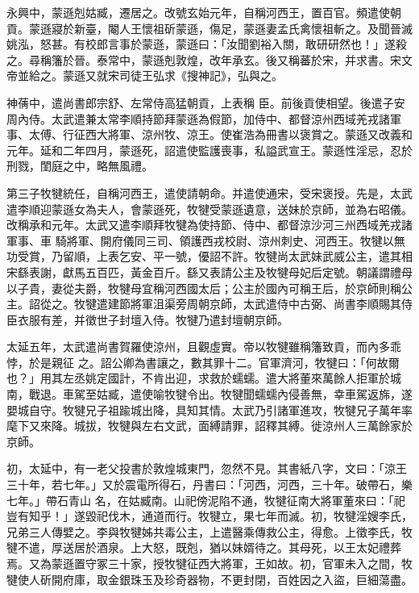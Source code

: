 \begin{pinyinscope}
 永興中，蒙遜剋姑臧，遷居之。改號玄始元年，自稱河西王，置百官。頻遣使朝貢。蒙遜寢於新臺，閹人王懷祖斫蒙遜，傷足，蒙遜妻孟氏禽懷祖斬之。及聞晉滅姚泓，怒甚。有校郎言事於蒙遜，蒙遜曰：「汝聞劉裕入關，敢研研然也！」遂殺之。尋稱籓於晉。泰常中，蒙遜剋敦煌，改年承玄。後又稱蕃於宋，并求書。宋文帝並給之。蒙遜又就宋司徒王弘求《搜神記》，弘與之。



 神蒨中，遣尚書郎宗舒、左常侍高猛朝貢，上表稱
 臣。前後貢使相望。後遣子安周內侍。太武遣兼太常李順持節拜蒙遜為假節，加侍中、都督涼州西域羌戎諸軍事、太傅、行征西大將軍、涼州牧、涼王。使崔浩為冊書以褒賞之。蒙遜又改義和元年。延和二年四月，蒙遜死，詔遣使監護喪事，私謚武宣王。蒙遜性淫忌，忍於刑戮，閨庭之中，略無風禮。



 第三子牧犍統任，自稱河西王，遣使請朝命。并遣使通宋，受宋褒授。先是，太武遣李順迎蒙遜女為夫人，會蒙遜死，牧犍受蒙遜遺意，送妹於京師，並為右昭儀。改稱承和元年。太武又遣李順拜牧犍為使持節、侍中、都督涼沙河三州西域羌戎諸軍事、車
 騎將軍、開府儀同三司、領護西戎校尉、涼州刺史、河西王。牧犍以無功受賞，乃留順，上表乞安、平一號，優詔不許。牧犍尚太武妹武威公主，遣其相宋繇表謝，獻馬五百匹，黃金百斤。繇又表請公主及牧犍母妃后定號。朝議謂禮母以子貴，妻從夫爵，牧犍母宜稱河西國太后；公主於國內可稱王后，於京師則稱公主。詔從之。牧犍遣建節將軍沮渠旁周朝京師，太武遣侍中古弼、尚書李順賜其侍臣衣服有差，并徵世子封壇入侍。牧犍乃遣封壇朝京師。



 太延五年，太武遣尚書賀羅使涼州，且觀虛實。帝以牧犍雖稱籓致貢，而內多乖悖，於是親征
 之。詔公卿為書讓之，數其罪十二。官軍濟河，牧犍曰：「何故爾也？」用其左丞姚定國計，不肯出迎，求救於蠕蠕。遣大將董來萬餘人拒軍於城南，戰退。車駕至姑臧，遣使喻牧犍令出。牧犍聞蠕蠕內侵善無，幸車駕返旆，遂嬰城自守。牧犍兄子祖踰城出降，具知其情。太武乃引諸軍進攻，牧犍兄子萬年率麾下又來降。城拔，牧犍與左右文武，面縛請罪，詔釋其縛。徙涼州人三萬餘家於京師。



 初，太延中，有一老父投書於敦煌城東門，忽然不見。其書紙八字，文曰：「涼王三十年，若七年。」又於震電所得石，丹書曰：「河西，河西，三十年。破帶石，樂七年。」帶石青山
 名，在姑臧南。山祀傍泥陷不通，牧犍征南大將軍董來曰：「祀豈有知乎！」遂毀祀伐木，通道而行。牧犍立，果七年而滅。初，牧犍淫嫂李氏，兄弟三人傳嬖之。李與牧犍姊共毒公主，上遣醫乘傳救公主，得愈。上徵李氏，牧犍不遣，厚送居於酒泉。上大怒，既剋，猶以妹婿待之。其母死，以王太妃禮葬焉。又為蒙遜置守冢三十家，授牧犍征西大將軍，王如故。初，官軍未入之間，牧犍使人斫開府庫，取金銀珠玉及珍奇器物，不更封閉，百姓因之入盜，巨細蕩盡。




\end{pinyinscope}
